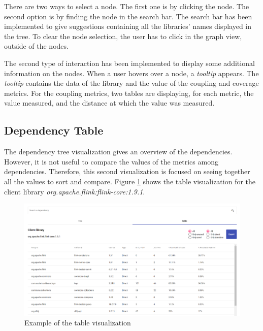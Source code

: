 There are two ways to select a node. The first one is by clicking the node. The second option is by finding the node in the search bar. The search bar has been implemented to give suggestions containing all the libraries' names displayed in the tree. To clear the node selection, the user has to click in the graph view, outside of the nodes.

The second type of interaction has been implemented to display some additional information on the nodes. When a user hovers over a node, a \textit{tooltip} appears. The \textit{tooltip} contains the data of the library and the value of the coupling and coverage metrics. For the coupling metrics, two tables are displaying, for each metric, the value measured, and the distance at which the value was measured.

\subsection{Dependency Table}
The dependency tree visualization gives an overview of the dependencies. However, it is not useful to compare the values of the metrics among dependencies. Therefore, this second visualization is focused on seeing together all the values to sort and compare. Figure \ref{fig:table-visualization} shows the table visualization for the client library \textit{org.apache.flink:flink-core:1.9.1}.

\begin{figure}[ht]
\begin{center}
\includegraphics[width=\textwidth]{figures/table-visualization.png}
\caption{Example of the table visualization}
\label{fig:table-visualization}
\end{center}
\end{figure}

